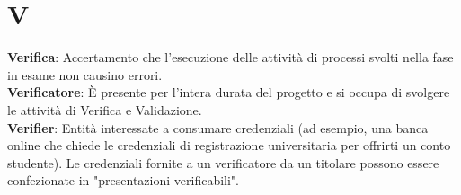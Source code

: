 \section{V}
\textbf{Verifica}: Accertamento che l’esecuzione delle attività di processi svolti nella fase in esame non causino errori.\\
\textbf{Verificatore}: È presente per l'intera durata del progetto e si occupa di svolgere le attività di Verifica e Validazione.\\
\textbf{Verifier}: Entità interessate a consumare credenziali (ad esempio, una banca online che chiede le credenziali di registrazione universitaria per offrirti un conto studente). Le credenziali fornite a un verificatore da un titolare possono essere confezionate in "presentazioni verificabili".\\